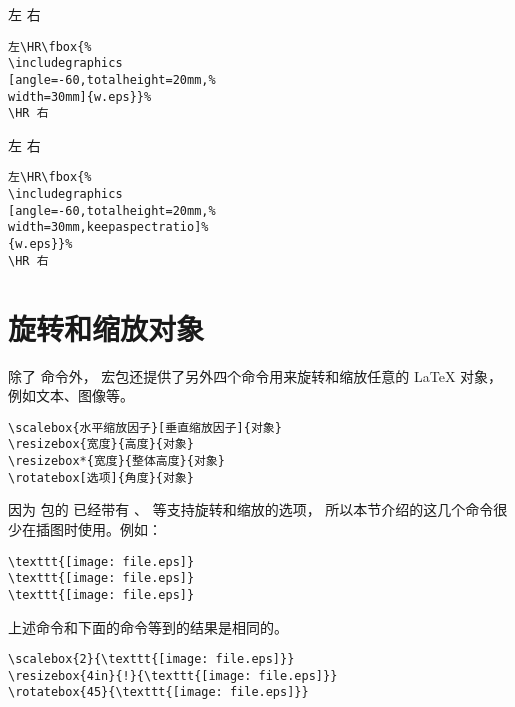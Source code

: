 \begin{minipage}[c]{.45\textwidth}
	左\HR{}%
	\HR 右
\end{minipage}%
\hspace{-.5cm}
\begin{minipage}[c]{.5\textwidth}
\begin{Verbatim}[frame=lines,label=\colorbox{green}{\small 例九},labelposition=topline,formatcom=\color{VerbatimColor}]
左\HR\fbox{%
\includegraphics
[angle=-60,totalheight=20mm,%
width=30mm]{w.eps}}%
\HR 右
\end{Verbatim}
\end{minipage}

\begin{minipage}[c]{.45\textwidth}
	左\HR\fbox{%
		\texttt{[image: w]}}%
	\HR 右
\end{minipage}%
\hspace{-.5cm}
\begin{minipage}[c]{.5\textwidth}
\begin{Verbatim}[frame=lines,label=\colorbox{green}{\small 例十},labelposition=topline,formatcom=\color{VerbatimColor}]
左\HR\fbox{%
\includegraphics
[angle=-60,totalheight=20mm,%
width=30mm,keepaspectratio]%
{w.eps}}%
\HR 右
\end{Verbatim}
\end{minipage}

\section{旋转和缩放对象}\label{sec:scalerotate}
除了 命令外，
 宏包还提供了另外四个命令用来旋转和缩放任意的 \LaTeX{} 对象，例如文本、图像等。
\begin{lstlisting}
\scalebox{水平缩放因子}[垂直缩放因子]{对象}
\resizebox{宽度}{高度}{对象}
\resizebox*{宽度}{整体高度}{对象}
\rotatebox[选项]{角度}{对象}
\end{lstlisting}

因为  包的  已经带有 、 等支持旋转和缩放的选项，
所以本节介绍的这几个命令很少在插图时使用。例如：
\begin{lstlisting}
\texttt{[image: file.eps]}
\texttt{[image: file.eps]}
\texttt{[image: file.eps]}
\end{lstlisting}
上述命令和下面的命令等到的结果是相同的。
\begin{lstlisting}
\scalebox{2}{\texttt{[image: file.eps]}}
\resizebox{4in}{!}{\texttt{[image: file.eps]}}
\rotatebox{45}{\texttt{[image: file.eps]}}
\end{lstlisting}

